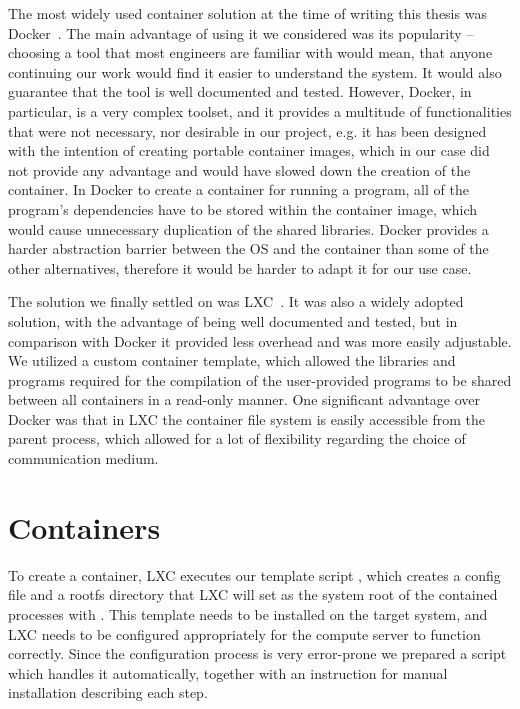 The most widely used container solution at the time of writing this thesis was
Docker~\cite{docker, Flexera19}. The main advantage of using it we considered
was its popularity -- choosing a tool that most engineers are familiar with
would mean, that anyone continuing our work would find it easier to understand
the system. It would also guarantee that the tool is well documented and
tested. However, Docker, in particular, is a very complex toolset, and it
provides a multitude of functionalities that were not necessary, nor desirable
in our project, e.g. it has been designed with the intention of creating
portable container images, which in our case did not provide any advantage and
would have slowed down the creation of the container.  In Docker to create a
container for running a program, all of the program's dependencies have to be
stored within the container image, which would cause unnecessary duplication of
the shared libraries. Docker provides a harder abstraction barrier between the
OS and the container than some of the other alternatives, therefore it would be
harder to adapt it for our use case.

The solution we finally settled on was LXC~\cite{lxc}. It was also a widely
adopted solution, with the advantage of being well documented and tested, but
in comparison with Docker it provided less overhead and was more easily
adjustable. We utilized a custom container template, which allowed the
libraries and programs required for the compilation of the user-provided
programs to be shared between all containers in a read-only manner. One
significant advantage over Docker was that in LXC the container file system is
easily accessible from the parent process, which allowed for a lot of
flexibility regarding the choice of communication medium.

\section{Containers}

To create a container, LXC executes our template script , which
creates a config file and a rootfs directory that LXC will set as the system
root of the contained processes with . This template needs to be
installed on the target system, and LXC needs to be configured appropriately for
the compute server to function correctly. Since the configuration process is
very error-prone we prepared a script which handles it automatically, together
with an instruction for manual installation describing each step.


